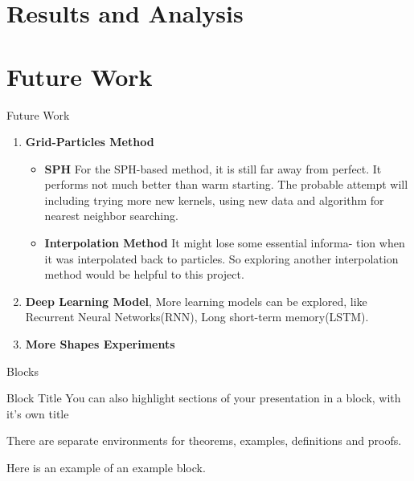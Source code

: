 \documentclass{beamer}
\begin{document}
\section{Results and Analysis}

\section{Future Work}
\begin{frame}{Future Work}
\begin{enumerate}
\item {
\textbf{Grid-Particles Method}
\pause
\begin{itemize}
\item {
\textbf{SPH}
\pause
For the SPH-based method, it is still far away from perfect. It performs not much better than warm starting. The probable attempt will including trying more new kernels, using new data and algorithm for nearest neighbor searching.
\pause
}
\item {
\textbf{Interpolation Method}
\pause
It might lose some essential informa- tion when it was interpolated back to particles. So exploring another interpolation method would be helpful to this project.
\pause
}
\end{itemize}
}

\item {
\textbf{Deep Learning Model},
\pause
More learning models can be explored, like Recurrent Neural Networks(RNN),  Long short-term memory(LSTM).
\pause
}

\item {
\textbf{More Shapes Experiments}
}
\end{enumerate}

\end{frame}

\begin{frame}{Blocks}
\begin{block}{Block Title}
You can also highlight sections of your presentation in a block, with it's own title
\end{block}
\begin{theorem}
There are separate environments for theorems, examples, definitions and proofs.
\end{theorem}
\begin{example}
Here is an example of an example block.
\end{example}
\end{frame}

\end{document}
